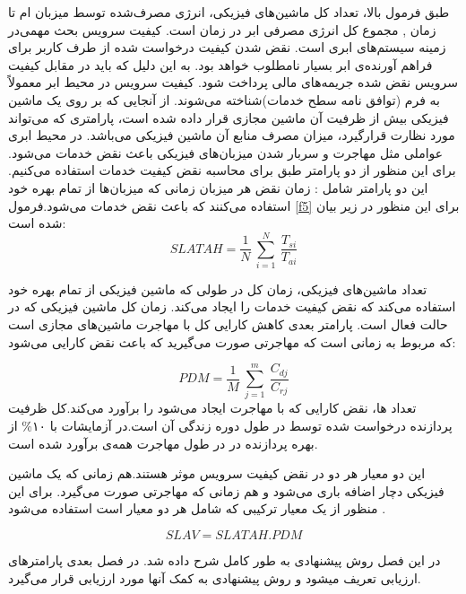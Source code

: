طبق فرمول بالا،
 تعداد کل ماشین‌های فیزیکی­،
  انرژی مصرف‌شده توسط میزبان 
   ام تا زمان
   ,
  مجموع کل انرژی مصرفی ابر در زمان
   است­.
   کیفیت سرویس بحث مهمی‌در زمینه سیستم‌های ابری است. نقض شدن کیفیت درخواست شده از طرف کاربر برای فراهم آورنده‌ی ابر بسیار نامطلوب خواهد بود. به این دلیل که باید در مقابل کیفیت سرویس نقض شده جریمه‌های مالی پرداخت شود. کیفیت سرویس در محیط ابر معمولاً به فرم
   (توافق نامه سطح خدمات)شناخته می‌شوند. از آنجایی که بر روی یک ماشین فیزیکی بیش از ظرفیت آن ماشین مجازی قرار داده‌ شده ‌است، پارامتری که می‌تواند مورد نظارت قرار‌گیرد، میزان مصرف منابع آن ماشین فیزیکی می‌باشد. 
   در محیط ابری عواملی مثل مهاجرت و سربار شدن میزبان‌های فیزیکی باعث نقض خدمات می‌شود. برای این منظور از دو پارامتر طبق
\cite{num15, num16}
   برای محاسبه نقض کیفیت خدمات استفاده می‌کنیم. این دو پارامتر شامل :
   زمان نقض
   هر میزبان
   زمانی که میزبان‌ها از تمام بهره خود استفاده می‌کنند که باعث نقض خدمات می‌شود.فرمول
\ref{f5}
    برای این منظور در زیر بیان شده است:
\cite{num16}
\begin{equation}
SLATAH=\frac{1}{N}\:\sum_{i=1}^{N}\:\frac{T_{si}}{T_{ai}}
\label{f5}
\end{equation}
   
   تعداد ماشین‌های فیزیکی،
      زمان کل در طولی که ماشین فیزیکی 
    از تمام بهره خود استفاده می‌کند که نقض کیفیت خدمات را ایجاد می‌کند. 
      زمان کل ماشین فیزیکی 
    که در حالت فعال است. 
   پارامتر بعدی کاهش کارایی کل با مهاجرت ماشین‌های مجازی
   است که مربوط به زمانی است که مهاجرتی صورت می‌گیرید که باعث نقض کارایی می‌شود: 
\cite{num16}

\begin{equation}
PDM = \frac{1}{M}\:\sum_{j=1}^{m}\:\frac{C_{dj}}{C_{rj}}
\label{f6}
\end{equation}
   تعداد
  ‌ها، 
    نقض کارایی 
    که با مهاجرت ایجاد می‌شود را برآورد می‌کند.کل ظرفیت پردازنده درخواست شده 
    توسط
          در طول دوره زندگی آن است.در آزمایشات 
      با 
      ۱۰\%
        از بهره پردازنده در
     در طول مهاجرت همه‌ی
     برآورد شده است.
     
   این دو معیار هر دو در نقض کیفیت سرویس موثر هستند.هم زمانی که یک ماشین فیزیکی دچار اضافه باری می‌شود و هم زمانی که مهاجرتی صورت می‌گیرد. برای این منظور از یک معیار ترکیبی که شامل هر دو معیار است استفاده می‌شود
   \cite{num16}.

\begin{equation}
   SLAV = SLATAH.PDM
\end{equation}
   
   در این فصل روش پیشنهادی به طور کامل شرح داده شد. در فصل بعدی پارامترهای ارزیابی تعریف می­شود و روش پیشنهادی به کمک آنها مورد ارزیابی قرار می‌گیرد.
